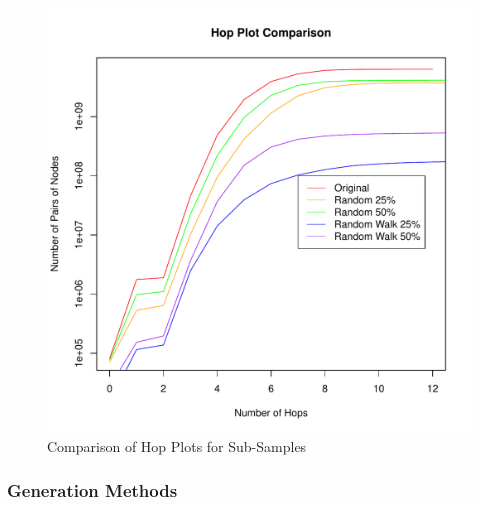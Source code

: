 \documentclass[pdftex,11pt,a4paper,twocolumn]{scrartcl}
\begin{document}

\pagebreak

\begin{figure}[h!]
\centering
\includegraphics[width=\columnwidth]{subsampleComparison_hop.pdf} 
\caption{Comparison of Hop Plots for Sub-Samples \label{fig:ssHop}}
\end{figure}


\subsubsection{Generation Methods}
\label{sec:genFigures} 
\end{document}
